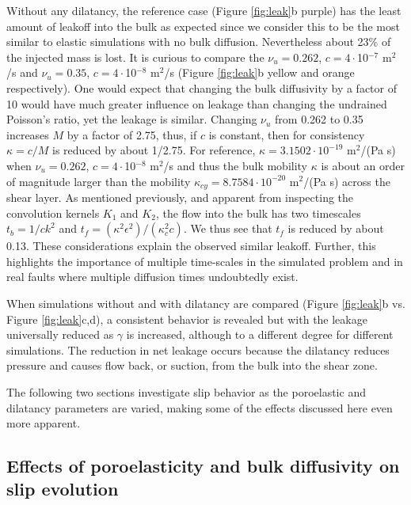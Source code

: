 \documentclass[draft]{agujournal2019}
\begin{document}
Without any dilatancy, the reference case (Figure \ref{fig:leak}b purple) has the least amount of leakoff into the bulk as expected since we consider this to be the most similar to elastic simulations with no bulk diffusion. Nevertheless about 23\% of the injected mass is lost. It is curious to compare the $\nu_u = 0.262$, $c = 4\cdot$10$^{-7}$ m$^2$/s and $\nu_u = 0.35$, $c = 4\cdot$10$^{-8}$ m$^2$/s  (Figure \ref{fig:leak}b yellow and orange respectively). One would expect that changing the bulk diffusivity by a factor of 10 would have much greater influence on leakage than changing the undrained Poisson's ratio, yet the leakage is similar. Changing $\nu_u$ from 0.262 to 0.35 increases $M$ by a factor of 2.75, thus, if $c$ is constant, then for consistency $\kappa = c/M$ is reduced by about 1/2.75. For reference, $\kappa = 3.1502 \cdot {10}^{-19}$ m$^2$/(Pa s) when  $\nu_u = 0.262$, $c = 4\cdot$10$^{-8}$ m$^2$/s and thus the bulk mobility $\kappa$ is about an order of  magnitude larger than the mobility $\kappa_{cy} =  8.7584 \cdot 10^{-20}$ m$^2$/(Pa s) across the shear layer. As mentioned previously, and apparent from inspecting the convolution kernels $K_1$ and $K_2$, the flow into the bulk has two timescales $t_b = 1/c k^2$ and  $t_{f} = ({\kappa^2 \epsilon^2})/({\kappa_c^2 c })$. We thus see that $t_f$ is reduced by about 0.13. These considerations explain the observed similar leakoff. Further, this highlights the importance of multiple time-scales in the simulated problem and in real faults where multiple diffusion times undoubtedly exist. 

When simulations without and with dilatancy are compared (Figure \ref{fig:leak}b vs. Figure \ref{fig:leak}c,d), a consistent behavior is revealed but with the leakage universally  reduced as $\gamma$ is increased, although to a different degree for different simulations. The reduction in net leakage occurs because the dilatancy reduces pressure and causes flow back, or suction, from the bulk into the shear zone.

The following two sections investigate slip behavior as the poroelastic and dilatancy parameters are varied, making some of the effects discussed here even more apparent.


\subsection{Effects of poroelasticity and bulk diffusivity on slip evolution}
\end{document}
